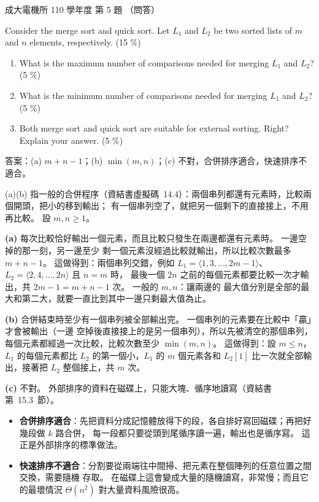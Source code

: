 \begin{pastexam}[label={px:ncku-110-ee-ds-05}]{成大電機所 110 學年度 第 5 題}
（問答）

Consider the merge sort and quick sort. Let $L_1$ and $L_2$ be two sorted lists of $m$ and $n$
elements, respectively. \quad (15 \%)
\begin{enumerate}[label=(\alph*)]
\item What is the maximum number of comparisons needed for merging $L_1$ and $L_2$? \hfill (5 \%)
\item What is the minimum number of comparisons needed for merging $L_1$ and $L_2$? \hfill (5 \%)
\item Both merge sort and quick sort are suitable for external sorting. Right? Explain your answer.
(5 \%)
\end{enumerate}
\end{pastexam}

\begin{pastsoln}
答案：(a) $m + n - 1$；(b) $\min(m, n)$；(c) 不對，合併排序適合，快速排序不適合。

(a)(b) 指一般的合併程序（資結書虛擬碼~14.4）：兩個串列都還有元素時，比較兩個開頭，把小的移到輸出；
有一個串列空了，就把另一個剩下的直接接上，不用再比較。 設 $m, n \ge 1$。

\textbf{(a)} 每次比較恰好輸出一個元素，而且比較只發生在兩邊都還有元素時。 一邊空掉的那一刻，另一邊至少
剩一個元素沒經過比較就輸出，所以比較次數最多 $m + n - 1$。 這做得到：兩個串列交錯，例如
$L_1 = \langle 1, 3, \ldots, 2m - 1\rangle$、$L_2 = \langle 2, 4, \ldots, 2n\rangle$ 且 $n = m$ 時，
最後一個 $2n$ 之前的每個元素都要比較一次才輸出，共 $2m - 1 = m + n - 1$ 次。 一般的 $m, n$：讓兩邊的
最大值分別是全部的最大和第二大，就要一直比到其中一邊只剩最大值為止。

\textbf{(b)} 合併結束時至少有一個串列被全部輸出完。 一個串列的元素要在比較中「贏」才會被輸出（一邊
空掉後直接接上的是另一個串列），所以先被清空的那個串列，每個元素都經過一次比較，比較次數至少
$\min(m, n)$。 這做得到：設 $m \le n$，$L_1$ 的每個元素都比 $L_2$ 的第一個小，$L_1$ 的 $m$ 個元素各和
$L_2[1]$ 比一次就全部輸出，接著把 $L_2$ 整個接上，共 $m$ 次。

\textbf{(c)} 不對。 外部排序的資料在磁碟上，只能大塊、循序地讀寫（資結書第~15.3~節）。
\begin{itemize}
\item \textbf{合併排序適合}：先把資料分成記憶體放得下的段，各自排好寫回磁碟；再把好幾段做 $k$ 路合併，
每一段都只要從頭到尾循序讀一遍，輸出也是循序寫。 這正是外部排序的標準做法。
\item \textbf{快速排序不適合}：分割要從兩端往中間掃、把元素在整個陣列的任意位置之間交換，需要隨機
存取。 在磁碟上這會變成大量的隨機讀寫，非常慢；而且它的最壞情況 $\Theta(n^2)$ 對大量資料風險很高。
\end{itemize}
\end{pastsoln}
